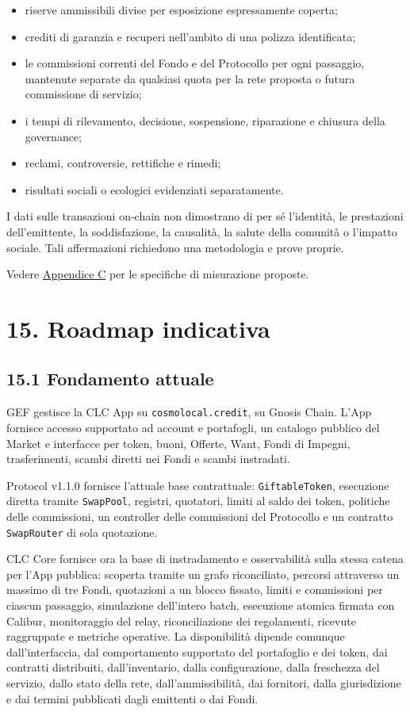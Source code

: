 \documentclass[11pt]{article}
\begin{document}
\begin{itemize}[leftmargin=*]
\item riserve ammissibili divise per esposizione espressamente coperta;
\item crediti di garanzia e recuperi nell'ambito di una polizza identificata;
\item le commissioni correnti del Fondo e del Protocollo per ogni passaggio, mantenute separate da qualsiasi quota per la rete proposta o futura commissione di servizio;
\item i tempi di rilevamento, decisione, sospensione, riparazione e chiusura della governance;
\item reclami, controversie, rettifiche e rimedi;
\item risultati sociali o ecologici evidenziati separatamente.
\end{itemize}
I dati sulle transazioni on-chain non dimostrano di per sé l'identità, le prestazioni dell'emittente, la soddisfazione, la causalità, la salute della comunità o l'impatto sociale. Tali affermazioni richiedono una metodologia e prove proprie.

Vedere \href{https://docs.cosmolocal.credit/it/white-paper/appendix-c-kpi-definitions}{Appendice C} per le specifiche di misurazione proposte.


\section*{15. Roadmap indicativa}

\subsection*{15.1 Fondamento attuale}

GEF gestisce la CLC App su \texttt{cosmolocal.credit}, su Gnosis Chain. L'App fornisce accesso supportato ad account e portafogli, un catalogo pubblico del Market e interfacce per token, buoni, Offerte, Want, Fondi di Impegni, trasferimenti, scambi diretti nei Fondi e scambi instradati.

Protocol v1.1.0 fornisce l'attuale base contrattuale: \texttt{GiftableToken}, esecuzione diretta tramite \texttt{SwapPool}, registri, quotatori, limiti al saldo dei token, politiche delle commissioni, un controller delle commissioni del Protocollo e un contratto \texttt{SwapRouter} di sola quotazione.

CLC Core fornisce ora la base di instradamento e osservabilità sulla stessa catena per l'App pubblica: scoperta tramite un grafo riconciliato, percorsi attraverso un massimo di tre Fondi, quotazioni a un blocco fissato, limiti e commissioni per ciascun passaggio, simulazione dell'intero batch, esecuzione atomica firmata con Calibur, monitoraggio del relay, riconciliazione dei regolamenti, ricevute raggruppate e metriche operative. La disponibilità dipende comunque dall'interfaccia, dal comportamento supportato del portafoglio e dei token, dai contratti distribuiti, dall'inventario, dalla configurazione, dalla freschezza del servizio, dallo stato della rete, dall'ammissibilità, dai fornitori, dalla giurisdizione e dai termini pubblicati dagli emittenti o dai Fondi.
\end{document}
